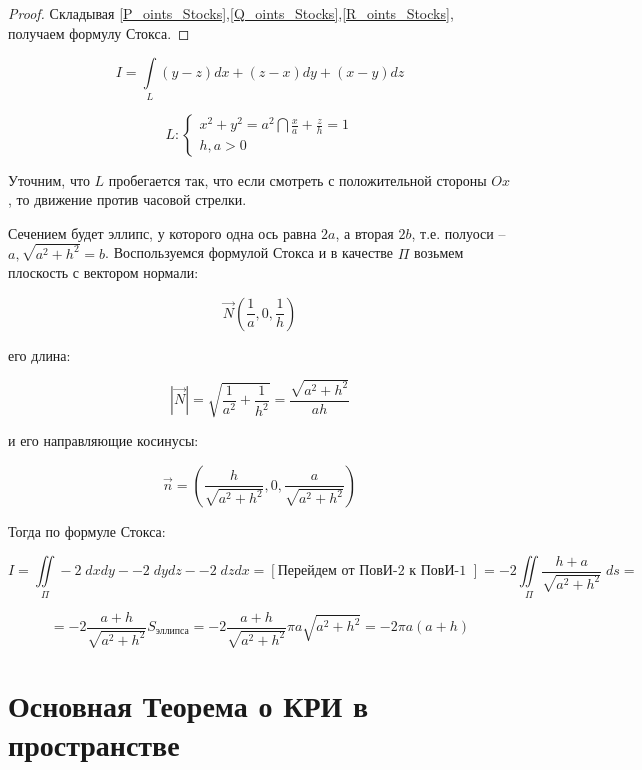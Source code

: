 \documentclass[../../main.tex]{subfiles}
\begin{document}
\begin{theorem}
\begin{proof}
			Складывая \eqref{P_oints_Stocks},\eqref{Q_oints_Stocks},\eqref{R_oints_Stocks}, получаем формулу Стокса.
			 
		\end{proof}	
	\end{theorem}
			
			
			\begin{example}
				\[ I = \int \limits_L \left( y-z \right) dx + \left( z-x \right) dy + \left( x-y \right) dz  \]
				
				\[ L: \begin{cases}
					x^2 + y^2 = a^2 \bigcap \frac{x}{a} + \frac{z}{h} = 1 \\
					h,a > 0 
				   \end{cases}
				 \]
				
		
			Уточним, что $L$ пробегается так, что если смотреть с положительной стороны $Ox$, то движение против часовой стрелки.
			
			
			Сечением будет эллипс, у которого одна ось равна $2a$, а вторая $2b$, т.е. полуоси \--- $a, \sqrt{a^2 + h^2} = b$. Воспользуемся формулой Стокса и в качестве $\Pi$ возьмем плоскость с вектором нормали:
			
			\[ \vec{N}\left( \frac{1}{a}, 0 , \frac{1}{h} \right)  \]
			
			его длина:
			
			\[ \left| \vec{N} \right|= \sqrt{\frac{1}{a^2} + \frac{1}{h^2} } = \frac{\sqrt{a^2 + h^2}}{ah}  \]
			
			и его направляющие косинусы:
			
			\[ \vec{n} = \left( \frac{h}{\sqrt{a^2 + h^2}}, 0, \frac{a}{\sqrt{a^2 + h^2}} \right)      \]
			
			Тогда по формуле Стокса:
			
			\[ I = \iint \limits_{\Pi} -2 \; dxdy - -2 \; dydz - -2 \; dzdx = \left[ \text{Перейдем от ПовИ-2 к ПовИ-1 } \right] = -2 \iint \limits_{\Pi} \frac{h+a}{\sqrt{a^2 + h^2}}  \; ds =        \]
			
			\[ = -2\frac{a+h}{\sqrt{a^2 + h^2}}  S_{\text{эллипса}} = -2\frac{a+h}{\sqrt{a^2 + h^2}} \pi a \sqrt{a^2 + h^2} = -2 \pi a \left( a+h \right)       \]
			
		\end{example}
			
		\section{Основная Теорема о КРИ в пространстве}
		
\end{document}
